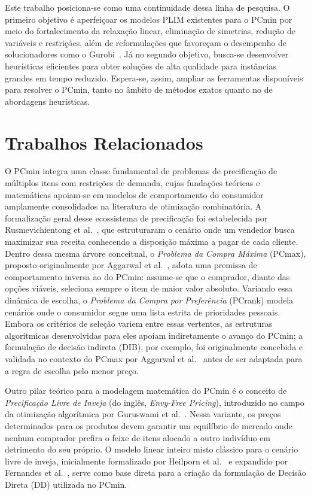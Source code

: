 \documentclass[11pt]{article}
\begin{document}
Este trabalho posiciona-se como uma continuidade dessa linha de pesquisa. O primeiro objetivo é aperfeiçoar os modelos PLIM existentes para o PCmin por meio do fortalecimento da relaxação linear, eliminação de simetrias, redução de variáveis e restrições, além de reformulações que favoreçam o desempenho de solucionadores como o Gurobi~\cite{gurobi}. Já no segundo objetivo, busca-se desenvolver heurísticas eficientes para obter soluções de alta qualidade para instâncias grandes em tempo reduzido. Espera-se, assim, ampliar as ferramentas disponíveis para resolver o PCmin, tanto no âmbito de métodos exatos quanto no de abordagens heurísticas. 
\section{Trabalhos Relacionados}

O PCmin integra uma classe fundamental de problemas de precificação de múltiplos itens com restrições de demanda, cujas fundações teóricas e matemáticas apoiam-se em modelos de comportamento do consumidor amplamente consolidados na literatura de otimização combinatória. A formalização geral desse ecossistema de precificação foi estabelecida por Rusmevichientong et al.~\cite{rusmevichientong2006}, que estruturaram o cenário onde um vendedor busca maximizar sua receita conhecendo a disposição máxima a pagar de cada cliente. Dentro dessa mesma árvore conceitual, o \emph{Problema da Compra Máxima} (PCmax), proposto originalmente por Aggarwal et al.~\cite{aggarwal2004}, adota uma premissa de comportamento inversa ao do PCmin: assume-se que o comprador, diante das opções viáveis, seleciona sempre o item de maior valor absoluto. Variando essa dinâmica de escolha, o \emph{Problema da Compra por Preferência} (PCrank) modela cenários onde o consumidor segue uma lista estrita de prioridades pessoais. Embora os critérios de seleção variem entre essas vertentes, as estruturas algorítmicas desenvolvidas para eles apoiam indiretamente o avanço do PCmin; a formulação de decisão indireta (DIB), por exemplo, foi originalmente concebida e validada no contexto do PCmax por Aggarwal et al.~\cite{aggarwal2004} antes de ser adaptada para a regra de escolha pelo menor preço.

Outro pilar teórico para a modelagem matemática do PCmin é o conceito de \emph{Precificação Livre de Inveja} (do inglês, \emph{Envy-Free Pricing}), introduzido no campo da otimização algorítmica por Guruswami et al.~\cite{venkatesan2005}. Nessa variante, os preços determinados para os produtos devem garantir um equilíbrio de mercado onde nenhum comprador prefira o feixe de itens alocado a outro indivíduo em detrimento do seu próprio. O modelo linear inteiro misto clássico para o cenário livre de inveja, inicialmente formalizado por Heilporn et al.~\cite{heilporn2010} e expandido por Fernandes et al.~\cite{fernandes2016}, serve como base direta para a criação da formulação de Decisão Direta (DD) utilizada no PCmin.
\end{document}
